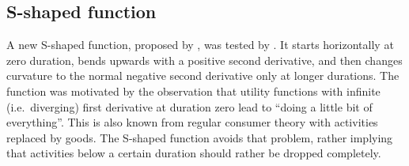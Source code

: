 

\subsection{S-shaped function}
A new S-shaped function, proposed by \citet[][]{Joh_PhDThesis_2004}, was tested by \citet[][p.129ff]{Feil_PhDThesis_2010}. 
It starts horizontally at zero duration, bends upwards with a positive second derivative, and then changes curvature to the normal negative second derivative only at longer durations.  
%
The function was motivated by the observation that utility functions with infinite (i.e.\ diverging) first derivative at duration zero lead to ``doing a little bit of everything''.  This is also known from regular consumer theory with activities replaced by goods.  The S-shaped function avoids that problem, rather implying that activities below a certain duration should rather be dropped completely.
%

